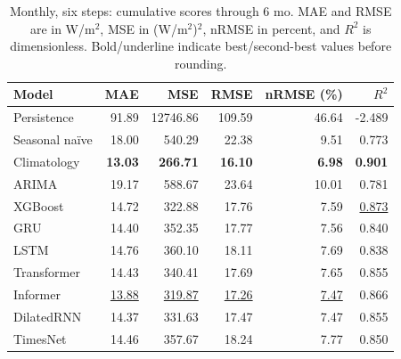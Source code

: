 \begin{table}[!htbp]
\centering
\small
\setlength{\tabcolsep}{6pt}
\caption{Monthly, six steps: cumulative scores through 6 mo. MAE and RMSE are in W/m$^2$, MSE in (W/m$^2$)$^2$, nRMSE in percent, and $R^2$ is dimensionless. Bold/underline indicate best/second-best values before rounding.}
\label{tab:baseline_monthly_6_6}
\begin{tabular}{@{}lrrrrr@{}}
\toprule
Model & MAE & MSE & RMSE & nRMSE (\%) & $R^2$ \\
\midrule
Persistence & 91.89 & 12746.86 & 109.59 & 46.64 & -2.489 \\
Seasonal na\"ive & 18.00 & 540.29 & 22.38 & 9.51 & 0.773 \\
Climatology & \textbf{13.03} & \textbf{266.71} & \textbf{16.10} & \textbf{6.98} & \textbf{0.901} \\
ARIMA & 19.17 & 588.67 & 23.64 & 10.01 & 0.781 \\
XGBoost & 14.72 & 322.88 & 17.76 & 7.59 & \underline{0.873} \\
GRU & 14.40 & 352.35 & 17.77 & 7.56 & 0.840 \\
LSTM & 14.76 & 360.10 & 18.11 & 7.69 & 0.838 \\
Transformer & 14.43 & 340.41 & 17.69 & 7.65 & 0.855 \\
Informer & \underline{13.88} & \underline{319.87} & \underline{17.26} & \underline{7.47} & 0.866 \\
DilatedRNN & 14.37 & 331.63 & 17.47 & 7.47 & 0.855 \\
TimesNet & 14.46 & 357.67 & 18.24 & 7.77 & 0.850 \\
\bottomrule
\end{tabular}
\end{table}
